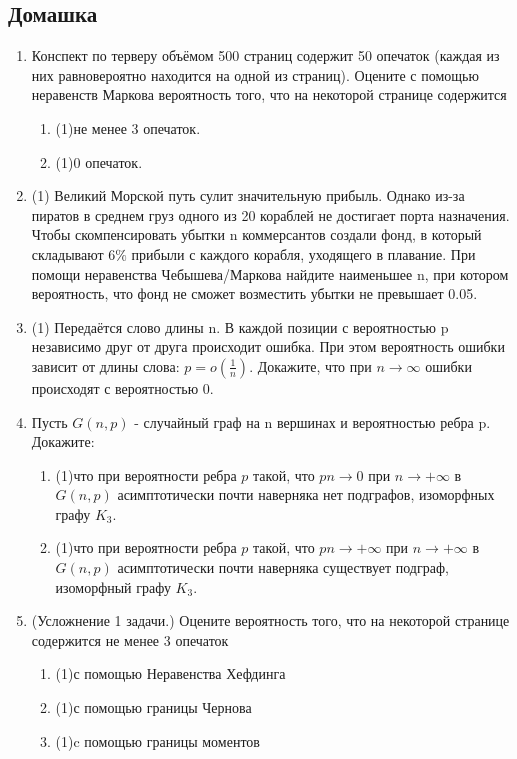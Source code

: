 \documentclass[a4paper, 14pt]{extarticle}
\begin{document}
\subsection*{Домашка}
\begin{enumerate}
\item Конспект по терверу объёмом 500 страниц содержит 50 опечаток (каждая из них равновероятно находится на одной из страниц). Оцените с помощью неравенств Маркова вероятность того, что на некоторой странице содержится 
\begin{enumerate}
    \item (1)не менее 3 опечаток.
    \item (1)0 опечаток.
\end{enumerate}
\item (1) Великий Морской путь сулит значительную прибыль. Однако из-за пиратов в среднем груз одного из 20 кораблей не достигает порта назначения. Чтобы скомпенсировать убытки n коммерсантов создали фонд, в который складывают $6\%$ прибыли с каждого корабля, уходящего в плавание. При помощи неравенства Чебышева/Маркова найдите наименьшее n, при котором вероятность, что фонд не сможет возместить убытки не превышает 0.05.
\item (1) Передаётся слово длины n. В каждой позиции с вероятностью p независимо друг от друга происходит ошибка. При этом вероятность ошибки зависит от длины слова: $p = o(\frac{1}{n})$. Докажите, что при $n \to \infty$ ошибки происходят с вероятностью 0.
\item Пусть $G(n,p)$ - случайный граф на n вершинах и вероятностью ребра p. Докажите: 
\begin{enumerate}
    \item (1)что при вероятности ребра $p$ такой, что $pn \to 0$ при $n\to +\infty$ в $G(n,p)$ асимптотически почти наверняка нет подграфов, изоморфных графу $K_3$.
    \item (1)что при вероятности ребра $p$ такой, что $pn \to +\infty$ при $n\to +\infty$ в $G(n,p)$ асимптотически почти наверняка существует подграф, изоморфный графу $K_3$.
\end{enumerate}
\item (Усложнение 1 задачи.) Оцените вероятность того, что на некоторой странице содержится не менее 3 опечаток 
\begin{enumerate}
    \item (1)с помощью Неравенства Хефдинга 
    \item (1)с помощью границы Чернова
    \item (1)c помощью границы моментов
\end{enumerate}

\end{enumerate}
\end{document}
